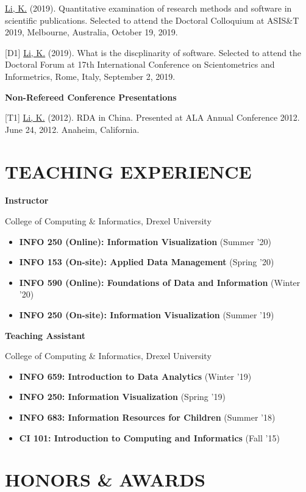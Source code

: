 \documentclass[margin, 10pt]{res} %
\begin{document}
\begin{resume}
[D2] \underline{Li, K.} (2019). Quantitative examination of research methods and software in scientific publications. Selected to attend the Doctoral Colloquium at ASIS\&T 2019, Melbourne, Australia, October 19, 2019.

[D1] \underline{Li, K.} (2019). What is the discplinarity of software. Selected to attend the Doctoral Forum at 17th International Conference on Scientometrics and Informetrics, Rome, Italy, September 2, 2019.

\textbf{Non-Refereed Conference Presentations}

[T1] \underline{Li, K.} (2012). RDA in China. Presented at ALA Annual Conference 2012. June 24, 2012. Anaheim, California.

\section{TEACHING EXPERIENCE}

\textbf{Instructor}

College of Computing \& Informatics, Drexel University

\begin{itemize}
\item \textbf{INFO 250 (Online): Information Visualization} (Summer '20)
\item \textbf{INFO 153 (On-site): Applied Data Management} (Spring '20)
\item \textbf{INFO 590 (Online): Foundations of Data and Information} (Winter '20)
\item \textbf{INFO 250 (On-site): Information Visualization} (Summer '19)
\end{itemize}

\textbf{Teaching Assistant}

College of Computing \& Informatics, Drexel University

\begin{itemize}
\item \textbf{INFO 659: Introduction to Data Analytics} (Winter '19)
\item \textbf{INFO 250: Information Visualization} (Spring '19)
\item \textbf{INFO 683: Information Resources for Children} (Summer '18)
\item \textbf{CI 101: Introduction to Computing and Informatics} (Fall '15)
\end{itemize}

\section{HONORS \& AWARDS}


\end{resume}
\end{document}
